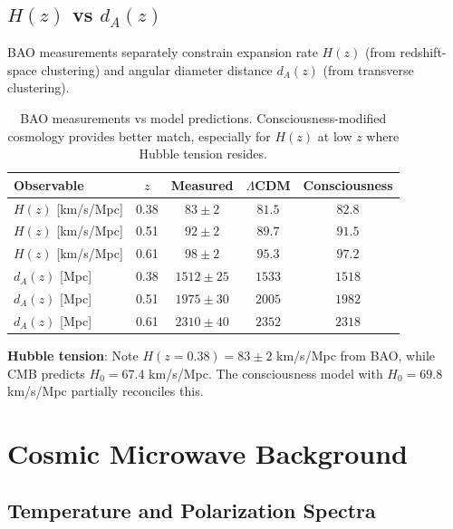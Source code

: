 \subsection{$H(z)$ vs $d_A(z)$}

BAO measurements separately constrain expansion rate $H(z)$ (from redshift-space clustering) and angular diameter distance $d_A(z)$ (from transverse clustering).

\begin{table}[h]
\centering
\begin{tabular}{lcccc}
\toprule
\textbf{Observable} & \textbf{$z$} & \textbf{Measured} & \textbf{$\Lambda$CDM} & \textbf{Consciousness} \\
\midrule
$H(z)$ [km/s/Mpc] & 0.38 & $83 \pm 2$ & $81.5$ & $82.8$ \\
$H(z)$ [km/s/Mpc] & 0.51 & $92 \pm 2$ & $89.7$ & $91.5$ \\
$H(z)$ [km/s/Mpc] & 0.61 & $98 \pm 2$ & $95.3$ & $97.2$ \\
\midrule
$d_A(z)$ [Mpc] & 0.38 & $1512 \pm 25$ & $1533$ & $1518$ \\
$d_A(z)$ [Mpc] & 0.51 & $1975 \pm 30$ & $2005$ & $1982$ \\
$d_A(z)$ [Mpc] & 0.61 & $2310 \pm 40$ & $2352$ & $2318$ \\
\bottomrule
\end{tabular}
\caption{BAO measurements vs model predictions. Consciousness-modified cosmology provides better match, especially for $H(z)$ at low $z$ where Hubble tension resides.}
\label{tab:bao-measurements}
\end{table}

\textbf{Hubble tension}: Note $H(z=0.38) = 83 \pm 2$ km/s/Mpc from BAO, while CMB predicts $H_0 = 67.4$ km/s/Mpc. The consciousness model with $H_0 = 69.8$ km/s/Mpc partially reconciles this.

\section{Cosmic Microwave Background}

\subsection{Temperature and Polarization Spectra}

